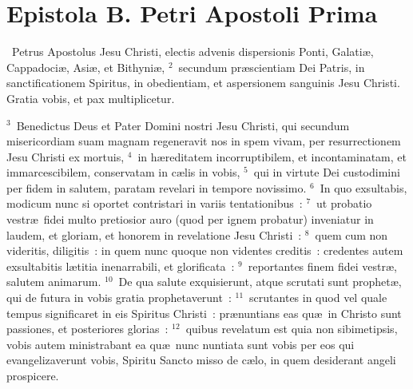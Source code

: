\clearpage
{\centering \section*{Epistola B. Petri Apostoli Prima}}\thispagestyle{empty}

~Petrus Apostolus Jesu Christi, electis advenis dispersionis Ponti, Galati\ae , Cappadoci\ae , Asi\ae , et Bithyni\ae ,
${}^{2}$~secundum pr\ae scientiam Dei Patris, in sanctificationem Spiritus, in obedientiam, et aspersionem sanguinis Jesu Christi. Gratia vobis, et pax multiplicetur.


${}^{3}$~Benedictus Deus et Pater Domini nostri Jesu Christi, qui secundum misericordiam suam magnam regeneravit nos in spem vivam, per resurrectionem Jesu Christi ex mortuis,
${}^{4}$~in h\ae reditatem incorruptibilem, et incontaminatam, et immarcescibilem, conservatam in c\ae lis in vobis,
${}^{5}$~qui in virtute Dei custodimini per fidem in salutem, paratam revelari in tempore novissimo.
${}^{6}$~In quo exsultabis, modicum nunc si oportet contristari in variis tentationibus~:
${}^{7}$~ut probatio vestr\ae\ fidei multo pretiosior auro (quod per ignem probatur) inveniatur in laudem, et gloriam, et honorem in revelatione Jesu Christi~:
${}^{8}$~quem cum non videritis, diligitis~: in quem nunc quoque non videntes creditis~: credentes autem exsultabitis l\ae titia inenarrabili, et glorificata~:
${}^{9}$~reportantes finem fidei vestr\ae , salutem animarum.
${}^{10}$~De qua salute exquisierunt, atque scrutati sunt prophet\ae , qui de futura in vobis gratia prophetaverunt~:
${}^{11}$~scrutantes in quod vel quale tempus significaret in eis Spiritus Christi~: pr\ae nuntians eas qu\ae\ in Christo sunt passiones, et posteriores glorias~:
${}^{12}$~quibus revelatum est quia non sibimetipsis, vobis autem ministrabant ea qu\ae\ nunc nuntiata sunt vobis per eos qui evangelizaverunt vobis, Spiritu Sancto misso de c\ae lo, in quem desiderant angeli prospicere.


